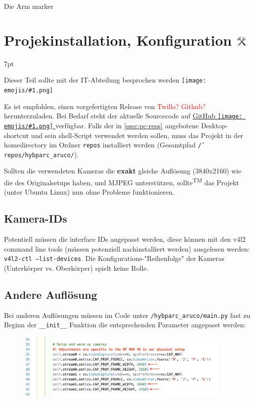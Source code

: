 \documentclass[a4paper, 10pt]{article}
\newcommand{\warn}[1]{\textcolor{red}{#1}}
\newcommand{\code}[1]{\texttt{#1}}
\newcommand{\emoji}[1]{
    \begingroup\normalfont
    \texttt{[image: emojis/\#1.png]}
    \endgroup
}
\newenvironment{formal}{%
\small
\vspace*{-4mm}
    \def\FrameCommand{%
    \hspace{1pt}%
    {\color{formalpipe}\vrule width 0.7mm}%
    {\color{formalshade}\vrule width 1.5mm}%
    \colorbox{formalshade}%
    }%
    \MakeFramed{\advance\hsize-\width\FrameRestore}%
    \noindent%
    \begin{adjustwidth}{}{7pt}%
    \vspace{2pt}\vspace{2pt}%
}
{%
    \vspace{2pt}\end{adjustwidth}\endMakeFramed%
}
\begin{document}
Die Arm marker 

\section{Projekinstallation, Konfiguration \includegraphics[height=0.65em]{emojis/hammer-and-wrench.png}}
\label{sec:installation-configuration}
\begin{formal}
    Dieser Teil sollte mit der IT-Abteilung besprochen werden\emoji{technologist}
\end{formal}
Es ist empfohlen, einen vorgefertigten Release von \warn{Twillo? Github?} herunterzuladen. Bei Bedarf steht der aktuelle Sourcecode auf \href{https://github.com/leloomi/hybparc_aruco}{GitHub\emoji{link}} verfügbar. Falls der in \ref{ssec:pc-reqs} angebotene Desktop-shortcut und sein shell-Script verwendet werden sollen, muss das Projekt in der homedirectory im Ordner \code{repos} installiert werden (Gesamtpfad \code{\~/repos/hybparc\_aruco/}).

Sollten die verwendeten Kameras die \textbf{exakt} gleiche Auflösung (3840x2160) wie die des Originalsetups haben, und MJPEG unterstützen, sollte\textsuperscript{\tiny TM} das Projekt (unter Ubuntu Linux) nun ohne Probleme funktionieren. 

\subsection{Kamera-IDs}
\label{ssec:cam-indices}
Potentiell müssen die interface IDs angepasst werden, diese können mit den v4l2 command line tools (müssen potenziell nachinstalliert werden) ausgelesen werden: \code{v4l2-ctl --list-devices}. Die Konfigurations-"Reihenfolge" der Kameras (Unterkörper vs. Oberkörper) spielt keine Rolle.

\subsection{Andere Auflösung}
\label{ssec:custom-resolution}
Bei anderen Auflösungen müssen im Code unter \code{/hybparc\_aruco/main.py} fast zu Beginn der \code{\_\_init\_\_} Funktion die entsprechenden Parameter angepasst werden:
\begin{figure}[H]
    \centering
    \includegraphics[width=10.5cm]{resolution.png}
\end{figure}
\end{document}
